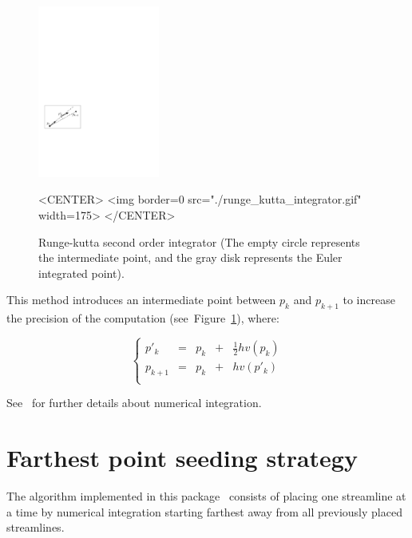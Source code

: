 \begin{figure}[h!]
\begin{ccTexOnly}
\begin{center}
\includegraphics[width=4cm]{Stream_lines_2/runge_kutta_integrator}
\end{center}
\end{ccTexOnly}
\caption{Runge-kutta second order integrator (The empty circle represents the intermediate point, and the gray disk represents the Euler integrated point).
\label{runge_kutta_fig}}
\begin{ccHtmlOnly}
<CENTER>
<img border=0 src="./runge_kutta_integrator.gif" width=175>
</CENTER>
\end{ccHtmlOnly}
\end{figure}

This method introduces an intermediate point  between $p_k$ and $p_{k+1}$ to increase the
precision of the computation (see~Figure~\ref{runge_kutta_fig}), where:

$$
\left\{ \begin{array}{ccccc}
    p'_k    & = & p_k & + & \frac{1}{2}hv(p_k) \\
    p_{k+1} & = & p_k & + & hv(p'_k)        \\
   \end{array}
\right.
$$

See~\cite{cgal:ptvf-nrcpp-02} for further details about numerical
integration.

\section{Farthest point seeding strategy}
\label{Section_2D_Streamlines_Strategy}

The algorithm implemented in this package~\cite{cgal:mad-fpsep-05}
consists of placing one streamline at a time by numerical integration
starting farthest away from all previously placed
streamlines.\\

